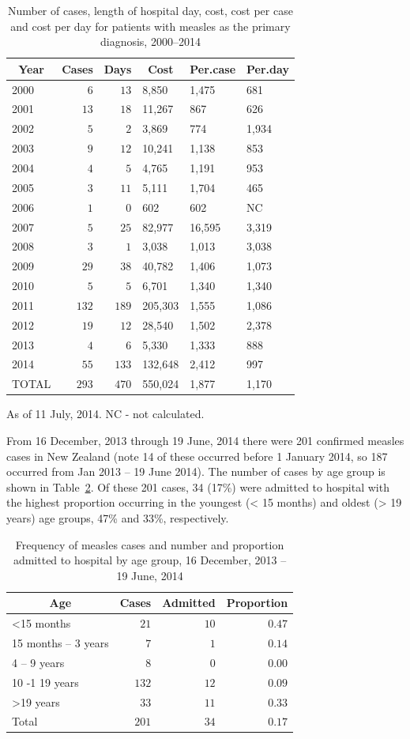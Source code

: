 \documentclass{article}
\begin{document}
\begin{table}
\caption{Number of cases, length of hospital day, cost, cost per case and cost per day for patients with measles as the primary diagnosis, 2000--2014}
\begin{center}
\begin{tabular}{lrrlll}
\hline\hline
\multicolumn{1}{c}{Year}&\multicolumn{1}{c}{Cases}&\multicolumn{1}{c}{Days}&\multicolumn{1}{c}{Cost}&\multicolumn{1}{c}{Per.case}&\multicolumn{1}{c}{Per.day}\tabularnewline
\hline
2000&$  6$&$ 13$&8,850&1,475&681\tabularnewline
2001&$ 13$&$ 18$&11,267&867&626\tabularnewline
2002&$  5$&$  2$&3,869&774&1,934\tabularnewline
2003&$  9$&$ 12$&10,241&1,138&853\tabularnewline
2004&$  4$&$  5$&4,765&1,191&953\tabularnewline
2005&$  3$&$ 11$&5,111&1,704&465\tabularnewline
2006&$  1$&$  0$&602&602&NC\tabularnewline
2007&$  5$&$ 25$&82,977&16,595&3,319\tabularnewline
2008&$  3$&$  1$&3,038&1,013&3,038\tabularnewline
2009&$ 29$&$ 38$&40,782&1,406&1,073\tabularnewline
2010&$  5$&$  5$&6,701&1,340&1,340\tabularnewline
2011&$132$&$189$&205,303&1,555&1,086\tabularnewline
2012&$ 19$&$ 12$&28,540&1,502&2,378\tabularnewline
2013&$  4$&$  6$&5,330&1,333&888\tabularnewline
2014&$ 55$&$133$&132,648&2,412&997\tabularnewline
TOTAL&$293$&$470$&550,024&1,877&1,170\tabularnewline
\hline
\end{tabular}\end{center}\label{table:hosp}
 \centering
 \begin{tablenotes}
      \small
      \item As of 11 July, 2014. NC - not calculated.
    \end{tablenotes}
\end{table}

From 16 December, 2013 through 19 June, 2014 there were 201 confirmed measles cases in New Zealand (note 14 of these occurred before 1 January 2014, so 187 occurred from Jan 2013 -- 19 June 2014). The number of cases by age group is shown in Table~\ref{table:freq}. Of these 201 cases, 34 (17\%) were admitted to hospital with the highest proportion occurring in the youngest (< 15 months) and oldest (> 19 years) age groups, 47\% and 33\%, respectively.


\begin{table}
\caption{Frequency of measles cases and number and proportion admitted to hospital by age group, 16 December, 2013 -- 19 June, 2014}
\begin{center}
\begin{tabular}{lrrr}
\hline\hline
\multicolumn{1}{c}{Age}&\multicolumn{1}{c}{Cases}&\multicolumn{1}{c}{Admitted}&\multicolumn{1}{c}{Proportion}\tabularnewline
\hline
\textless  15 months&$ 21$&$10$&$0.47$\tabularnewline
15 months – 3 years&$  7$&$ 1$&$0.14$\tabularnewline
4 – 9 years&$  8$&$ 0$&$0.00$\tabularnewline
10 -1 19 years&$132$&$12$&$0.09$\tabularnewline
\textgreater  19 years&$ 33$&$11$&$0.33$\tabularnewline
Total&$201$&$34$&$0.17$\tabularnewline
\hline
\end{tabular}\end{center}\label{table:freq}
\end{table}
\end{document}
